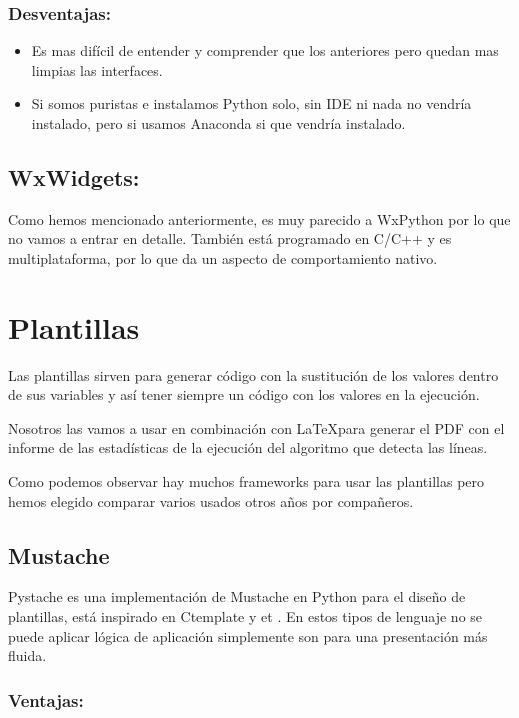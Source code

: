 \subsubsection{Desventajas:}

\begin{itemize}
\item Es mas difícil de entender y comprender que los anteriores pero quedan mas limpias las interfaces.
\item Si somos puristas e instalamos Python solo, sin IDE ni nada no vendría instalado, pero si usamos Anaconda si que vendría instalado.
\end{itemize}

\subsection{WxWidgets:}
Como hemos mencionado anteriormente, es muy parecido a WxPython por lo que no vamos a entrar en detalle. También está programado en C/C++ y es multiplataforma, por lo que da un aspecto de comportamiento nativo.



\section{Plantillas}
Las plantillas sirven para generar código con la sustitución de los valores dentro de sus variables y así tener siempre un código con los valores en la ejecución.

Nosotros las vamos a usar en combinación con \LaTeX para generar el PDF con el informe de las estadísticas de la ejecución del algoritmo que detecta las líneas.

Como podemos observar hay muchos frameworks para usar las plantillas pero hemos elegido comparar varios usados otros años por compañeros.
\subsection{Mustache}
Pystache es una implementación de Mustache en Python para el diseño de plantillas, está inspirado en Ctemplate \cite{GitHub:CTemplate} y et \cite{et}.
En estos tipos de lenguaje no se puede aplicar lógica de aplicación simplemente son para una presentación más fluida.

\subsubsection{Ventajas:}


